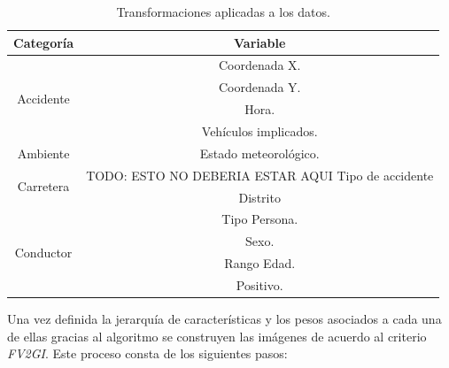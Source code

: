 \begin{enumerate}
            \begin{table}[H]
              \centering
              \begin{tabular}{ |c|c| }
                   \toprule
                   \textbf{Categoría} & \textbf{Variable}\\

                   \midrule
                   \multirow{4}{*}{Accidente}            & Coordenada X.\\
                                                         & Coordenada Y.\\
                                                         & Hora.\\
                                                         & Vehículos implicados.\\

                   \midrule
                   \multirow{1}{*}{Ambiente}             & Estado meteorológico.\\

                   \midrule
                   \multirow{2}{*}{Carretera}            & TODO: ESTO NO DEBERIA ESTAR AQUI Tipo de accidente\\
                                                         & Distrito\\

                   \midrule
                   \multirow{4}{*}{Conductor}            & Tipo Persona.\\
                                                         & Sexo.\\
                                                         & Rango Edad.\\
                                                         & Positivo.\\

                   \bottomrule
              \end{tabular}
              \caption{Transformaciones aplicadas a los datos.}
              \label{JerarquiaCaracteristicasTabla}
            \end{table}



            Una vez definida la jerarquía de características y los pesos asociados a cada una de ellas gracias al algoritmo  se construyen las imágenes de acuerdo al criterio \textit{FV2GI}. Este proceso consta de los siguientes pasos:

            \begin{enumerate}


\end{enumerate}
\end{enumerate}
